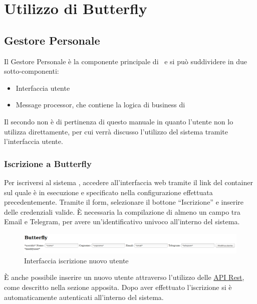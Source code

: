 \section{Utilizzo di Butterfly}\label{utilizzo}

\subsection{Gestore Personale}

Il Gestore Personale è la componente principale di \progetto\ e si può suddividere in due sotto-componenti:

\begin{itemize}
    \item Interfaccia utente
    \item Message processor, che contiene la logica di business di \progetto
\end{itemize}

Il secondo non è di pertinenza di questo manuale in quanto l'utente non lo utilizza direttamente, per cui verrà discusso l'utilizzo del sistema tramite l'interfaccia utente.

\subsubsection{Iscrizione a Butterfly}
Per iscriversi al sistema \progetto, accedere all'interfaccia web tramite il link del container sul quale è in esecuzione e specificato nella configurazione effettuata precedentemente.
Tramite il form, selezionare il bottone ``Iscrizione'' e inserire delle credenziali valide.
È necessaria la compilazione di almeno un campo tra Email e Telegram, per avere un'identificativo univoco all'interno del sistema.
\begin{figure}[H]
	\centering
	\includegraphics[width=\textwidth]{img/iscrizione_1.png}%
	\caption{Interfaccia iscrizione nuovo utente}
\end{figure}
È anche possibile inserire un nuovo utente attraverso l'utilizzo delle \hyperref[APIRest]{API Rest}, come descritto nella sezione apposita.
Dopo aver effettuato l'iscrizione si è automaticamente autenticati all'interno del sistema. %


